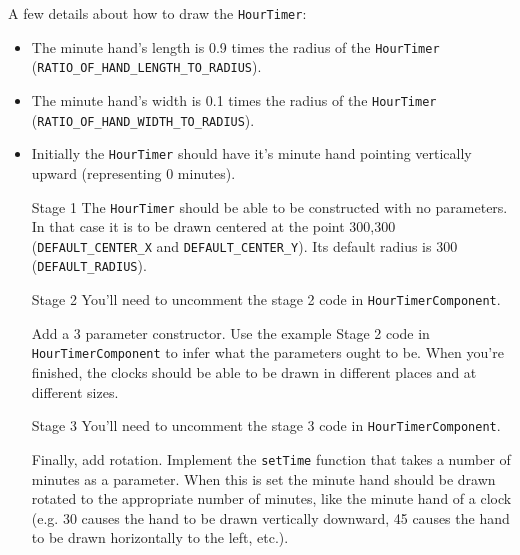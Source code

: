 \documentclass[12pt,twoside]{article}
\newcommand{\code}[1]{\texttt{#1}}
\begin{document}
A few details about how to draw the \code{HourTimer}:
\begin{itemize}
\item The minute hand's length is 0.9 times the radius of the
\code{HourTimer}\\(\code{RATIO_OF_HAND_LENGTH_TO_RADIUS}).
\item The minute
hand's width is 0.1 times the radius of the \code{HourTimer}\\ (\code{RATIO_OF_HAND_WIDTH_TO_RADIUS}). 
\item Initially the \code{HourTimer} should have it's minute hand pointing vertically upward (representing 0 minutes).
\end{itemize}


\begin{itemize}
\item[Stage 1] The \code{HourTimer} should be able to be constructed with no parameters.  In that case it is to be drawn centered at the point 300,300 (\code{DEFAULT_CENTER_X} and \code{DEFAULT_CENTER_Y}).  Its default radius is 300 (\code{DEFAULT_RADIUS}).


\item[Stage 2]  
You'll need to uncomment the stage 2 code in \code{HourTimerComponent}.

Add a 3 parameter constructor.  Use the example Stage 2 code in \code{HourTimerComponent} to infer what the parameters ought to be.  When you're finished, the clocks should be able to be drawn in different places and at different sizes.


\item[Stage 3] 
You'll need to uncomment the stage 3 code in \code{HourTimerComponent}.

Finally, add rotation.  Implement the \code{setTime} function that takes a number of minutes as a parameter.  When this is set the minute hand should be drawn rotated to the appropriate number of minutes, like the minute hand of a clock (e.g. 30 causes the hand to be drawn vertically downward, 45 causes the hand to be drawn horizontally to the left, etc.).

\end{itemize}


\vspace{.75in}
\end{document}
